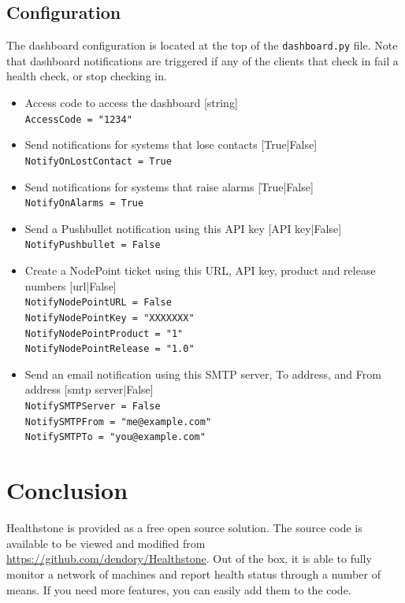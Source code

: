 \documentclass[11pt]{article}
\begin{document}
\subsection{Configuration}

The dashboard configuration is located at the top of the \texttt{dashboard.py} file. Note that dashboard notifications are triggered if any of the clients that check in fail a health check, or stop checking in.

\begin{itemize}
\item Access code to access the dashboard [string]\\
\texttt{AccessCode = "1234"}
\item Send notifications for systems that lose contacts [True|False]\\
\texttt{NotifyOnLostContact = True}
\item Send notifications for systems that raise alarms [True|False]\\
\texttt{NotifyOnAlarms = True}
\item Send a Pushbullet notification using this API key [API key|False]\\
\texttt{NotifyPushbullet = False}
\item Create a NodePoint ticket using this URL, API key, product and release numbers [url|False]\\
\texttt{NotifyNodePointURL = False}\\
\texttt{NotifyNodePointKey = "XXXXXXX"}\\
\texttt{NotifyNodePointProduct = "1"}\\
\texttt{NotifyNodePointRelease = "1.0"}
\item Send an email notification using this SMTP server, To address, and From address [smtp server|False]\\
\texttt{NotifySMTPServer = False}\\
\texttt{NotifySMTPFrom = "me@example.com"}\\
\texttt{NotifySMTPTo = "you@example.com"}
\end{itemize}

\section{Conclusion}

Healthstone is provided as a free open source solution. The source code is available to be viewed and modified from \url{https://github.com/dendory/Healthstone}. Out of the box, it is able to fully monitor a network of machines and report health status through a number of means. If you need more features, you can easily add them to the code.
\end{document}
